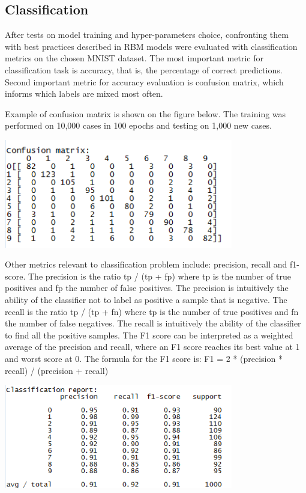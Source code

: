 \documentclass[a4paper]{scrartcl}
\begin{document}
\subsection{Classification}
After tests on model training and hyper-parameters choice, confronting them with best practices described in \cite{Hinton} RBM models were evaluated with classification metrics on the chosen MNIST dataset. The most important metric for classification task is accuracy, that is, the percentage of correct predictions. Second important metric for accuracy evaluation is confusion matrix, which informs which labels are mixed most often. 
\par Example of confusion matrix is shown on the figure below. The training was performed on 10,000 cases in 100 epochs and testing on 1,000 new cases.
\begin{center}
\includegraphics[width=10cm]{images/conf_matrix.png}
\end{center}
Other metrics relevant to classification problem include: precision, recall and f1-score. The precision is the ratio tp / (tp + fp) where tp is the number of true positives and fp the number of false positives. The precision is intuitively the ability of the classifier not to label as positive a sample that is negative. The recall is the ratio tp / (tp + fn) where tp is the number of true positives and fn the number of false negatives. The recall is intuitively the ability of the classifier to find all the positive samples. The F1 score can be interpreted as a weighted average of the precision and recall, where an F1 score reaches its best value at 1 and worst score at 0. The formula for the F1 score is: \newline 
F1 = 2 * (precision * recall) / (precision + recall)

\begin{center}
\includegraphics[width=10cm]{images/class_metrics.png}
\end{center}
\end{document}
